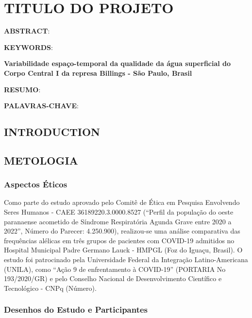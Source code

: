 \documentclass[
]{article}
\author{}
\date{\vspace{-2.5em}}
\begin{document}
{
\setcounter{tocdepth}{2}
\tableofcontents
}
\hypertarget{titulo-do-projeto}{%
\section{TITULO DO PROJETO}\label{titulo-do-projeto}}

\textbf{ABSTRACT}:

\textbf{KEYWORDS}:

\textbf{Variabilidade espaço-temporal da qualidade da água superficial do Corpo Central I da represa Billings - São Paulo, Brasil}

\textbf{RESUMO}:

\textbf{PALAVRAS-CHAVE}:

\hypertarget{introduction}{%
\subsection{INTRODUCTION}\label{introduction}}

\hypertarget{metologia}{%
\subsection{METOLOGIA}\label{metologia}}

\hypertarget{aspectos-uxe9ticos}{%
\subsubsection{Aspectos Éticos}\label{aspectos-uxe9ticos}}

Como parte do estudo aprovado pelo Comitê de Ética em Pesquisa Envolvendo Seres Humanos - CAEE 36189220.3.0000.8527 (``Perfil da população do oeste paranaense acometido de Síndrome Respiratória Agunda Grave entre 2020 a 2022'', Número do Parecer: 4.250.900), realizou-se uma análise comparativa das frequências alélicas em três grupos de pacientes com COVID-19 admitidos no Hospital Municipal Padre Germano Lauck - HMPGL (Foz do Iguaçu, Brasil). O estudo foi patrocinado pela Universidade Federal da Integração Latino-Americana (UNILA), como ``Ação 9 de enfrentamento à COVID-19'' (PORTARIA No 193/2020/GR) e pelo Conselho Nacional de Desenvolvimento Científico e Tecnológico - CNPq (Número).

\hypertarget{desenhos-do-estudo-e-participantes}{%
\subsubsection{Desenhos do Estudo e Participantes}\label{desenhos-do-estudo-e-participantes}}
\end{document}

